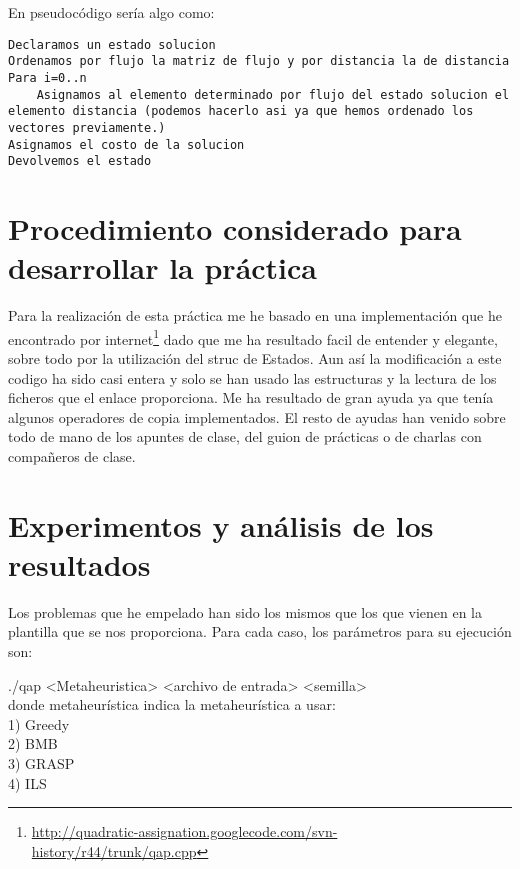En pseudocódigo sería algo como:

\begin{lstlisting}[language=SH]
Declaramos un estado solucion
Ordenamos por flujo la matriz de flujo y por distancia la de distancia
Para i=0..n
	Asignamos al elemento determinado por flujo del estado solucion el elemento distancia (podemos hacerlo asi ya que hemos ordenado los vectores previamente.)
Asignamos el costo de la solucion
Devolvemos el estado

\end{lstlisting}

\section{Procedimiento considerado para desarrollar la práctica}
Para la realización de esta práctica me he basado en una implementación que he encontrado por internet\footnote{\url{http://quadratic-assignation.googlecode.com/svn-history/r44/trunk/qap.cpp}} dado que me ha resultado facil de entender y elegante, sobre todo por la utilización del struc de Estados. Aun así la modificación a este codigo ha sido casi entera y solo se han usado las estructuras y la lectura de los ficheros que el enlace proporciona. Me ha resultado de gran ayuda ya que tenía algunos operadores de copia implementados. El resto de ayudas han venido sobre todo de mano de los apuntes de clase, del guion de prácticas o de charlas con compañeros de clase.

\section{Experimentos y análisis de los resultados}

Los problemas que he empelado han sido los mismos que los que vienen en la plantilla que se nos proporciona. Para cada caso, los parámetros para su ejecución son:

./qap <Metaheuristica> <archivo de entrada> <semilla>\\

donde metaheurística indica la metaheurística a usar:\\
1) Greedy\\
2) BMB\\
3) GRASP\\
4) ILS\\

